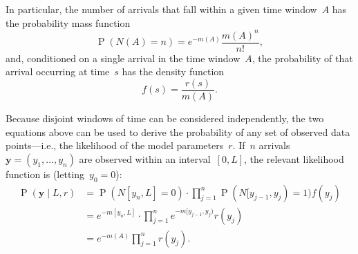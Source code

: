 \documentclass[11pt,a4paper]{article}
\newcommand\ub[1]{\symbf{#1}}                    %
\DeclareMathOperator\Pb{P}                       %
\theoremstyle{definition}
\begin{document}
In particular, the number of arrivals that fall within a given time window~$A$
has the probability mass function
\[ \Pb(N(A) = n) = e^{-m(A)} \frac{m(A)^n}{n!}, \]
and, conditioned on a single arrival in the time window~$A$, the probability of
that arrival occurring at time~$s$ has the density function
\[ f(s) = \frac{r(s)}{m(A)}. \]

Because disjoint windows of time can be considered independently, the two
equations above can be used to derive the probability of any set of observed
data points---i.e., the likelihood of the model parameters~$r$. If~$n$
arrivals~$\ub{y} = (y_1,\dots,y_n)$ are observed within an interval~$[0,L]$, the
relevant likelihood function is (letting~$y_0=0$):
\begin{align}\label{eqn:likelihood}
  \Pb(\ub{y} \mid L,r) &= \Pb(N[y_n,L] = 0) \cdot 
      \prod_{j=1}^n \Pb(N[y_{j-1},y_j) = 1) f(y_j) \nonumber \\
    &= e^{-m[y_n,L]} \cdot \prod_{j=1}^n e^{-m[y_{j-1},y_j)} r(y_j) \nonumber \\
    &= e^{-m(A)} \prod_{j=1}^n r(y_j).
\end{align}
\end{document}
